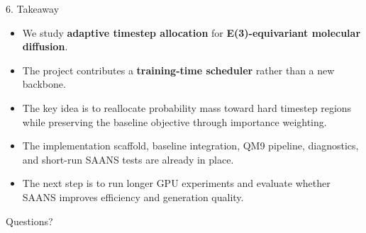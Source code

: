 \documentclass[aspectratio=169,11pt]{beamer}
\begin{document}
\begin{frame}{6. Takeaway}
\small
\begin{itemize}
    \item We study \textbf{adaptive timestep allocation} for \textbf{E(3)-equivariant molecular diffusion}.
    \item The project contributes a \textbf{training-time scheduler} rather than a new backbone.
    \item The key idea is to reallocate probability mass toward hard timestep regions while preserving the baseline objective through importance weighting.
    \item The implementation scaffold, baseline integration, QM9 pipeline, diagnostics, and short-run SAANS tests are already in place.
    \item The next step is to run longer GPU experiments and evaluate whether SAANS improves efficiency and generation quality.
\end{itemize}

\vspace{0.5em}
\centering
\Large Questions?
\end{frame}
\end{document}
